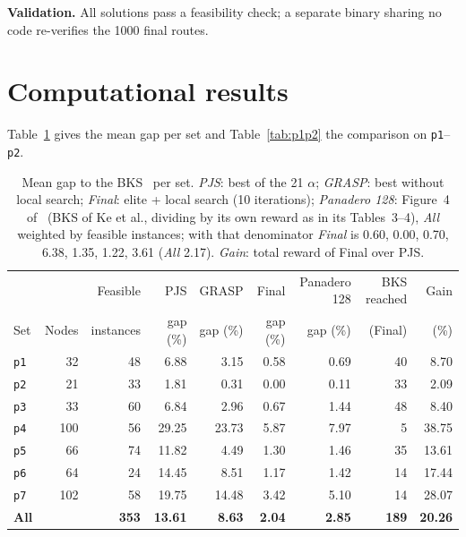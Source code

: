 \documentclass[10pt,a4paper]{article}
\begin{document}
\textbf{Validation.} All solutions pass a feasibility check; a separate binary sharing no code re-verifies
the 1000 final routes.

\section{Computational results}
\label{sec:res}

Table~\ref{tab:results} gives the mean gap per set and Table~\ref{tab:p1p2} the comparison on
\texttt{p1}--\texttt{p2}.

\begin{table}[!t]
\centering
\caption{Mean gap to the BKS~\cite{dang2013} per set. \emph{PJS}: best of the 21 $\alpha$;
\emph{GRASP}: best without local search; \emph{Final}: elite + local search (10 iterations);
\emph{Panadero 128}: Figure~4 of~\cite{panadero2021} (BKS of Ke et al., dividing by its own
reward as in its Tables~3--4), \emph{All} weighted by feasible instances; with that denominator
\emph{Final} is 0.60, 0.00, 0.70, 6.38, 1.35, 1.22, 3.61 (\emph{All} 2.17). \emph{Gain}: total reward of Final over PJS.}
\label{tab:results}
\scriptsize
\setlength{\tabcolsep}{4pt}
\begin{tabular}{@{}lrrrrrrrr@{}}
\toprule
 & & Feasible & PJS & GRASP & Final & Panadero 128 & BKS reached & Gain \\
Set & Nodes & instances & gap (\%) & gap (\%) & gap (\%) & gap (\%) & (Final) & (\%) \\
\midrule
\texttt{p1} & 32 & 48 & 6.88 & 3.15 & 0.58 & 0.69 & 40 & 8.70 \\
\texttt{p2} & 21 & 33 & 1.81 & 0.31 & 0.00 & 0.11 & 33 & 2.09 \\
\texttt{p3} & 33 & 60 & 6.84 & 2.96 & 0.67 & 1.44 & 48 & 8.40 \\
\texttt{p4} & 100 & 56 & 29.25 & 23.73 & 5.87 & 7.97 & 5 & 38.75 \\
\texttt{p5} & 66 & 74 & 11.82 & 4.49 & 1.30 & 1.46 & 35 & 13.61 \\
\texttt{p6} & 64 & 24 & 14.45 & 8.51 & 1.17 & 1.42 & 14 & 17.44 \\
\texttt{p7} & 102 & 58 & 19.75 & 14.48 & 3.42 & 5.10 & 14 & 28.07 \\
\midrule
\textbf{All} & & \textbf{353} & \textbf{13.61} & \textbf{8.63} & \textbf{2.04} & \textbf{2.85} & \textbf{189} & \textbf{20.26} \\
\bottomrule
\end{tabular}
\end{table}
\end{document}
